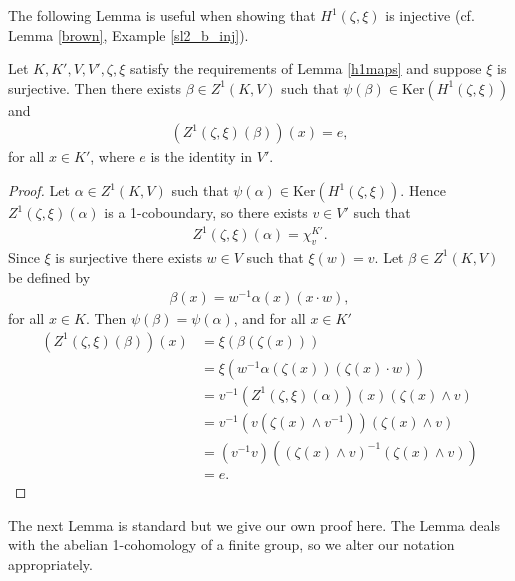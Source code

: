 The following Lemma is useful when showing that $H^1(\zeta, \xi)$ is injective (cf. Lemma \ref{brown}, Example \ref{sl2_b_inj}).

\begin{lemma}\label{kerh1} Let $K, K', V, V', \zeta, \xi$ satisfy the requirements of Lemma \ref{h1maps} and suppose $\xi$ is surjective. 
Then there exists $\beta \in Z^1(K, V)$ such that $\psi(\beta) \in \mathrm{Ker}\left(H^1(\zeta, \xi)\right)$ and
\begin{align*}
	\left(Z^1(\zeta, \xi)(\beta)\right)(x) = e,
\end{align*}
for all $x \in K'$, where $e$ is the identity in $V'$.
\end{lemma}
\begin{proof}
	Let $\alpha \in Z^1(K, V)$ such that $\psi(\alpha) \in \mathrm{Ker}\left(H^1(\zeta, \xi)\right)$. Hence $Z^1(\zeta, \xi)(\alpha)$ is a 1-coboundary, so there exists $v \in V'$ such that
\begin{align*}
	Z^1(\zeta, \xi)(\alpha) = \chi^{K'}_v.
\end{align*}
Since $\xi$ is surjective there exists $w \in V$ such that $\xi(w) = v$.
Let $\beta \in Z^1(K, V)$ be defined by
\begin{align*}
	\beta(x) = w^{-1}\alpha(x)(x \cdot w),
\end{align*}
for all $x \in K$. Then $\psi(\beta) = \psi(\alpha)$, and for all $x \in K'$
\begin{align*}
	\left(Z^1(\zeta, \xi)(\beta)\right)(x) &= \xi\left(\beta(\zeta(x))\right) \\
		&= \xi\left(w^{-1}\alpha(\zeta(x))(\zeta(x)\cdot w )\right) \\
		&= v^{-1} \left(Z^1(\zeta, \xi)(\alpha)\right)(x) (\zeta(x) \wedge v ) \\
		&= v^{-1} \left(v(\zeta(x) \wedge v^{-1})\right) (\zeta(x) \wedge v ) \\
		&= (v^{-1} v) \left((\zeta(x) \wedge v)^{-1} (\zeta(x) \wedge v )\right) \\
		&= e.
\end{align*}
\end{proof}

The next Lemma is standard \cite[Theorem 10.3]{brown1976cohomology} but we give our own proof here. The Lemma deals with the abelian 1-cohomology of a finite group, so we alter our notation appropriately.

